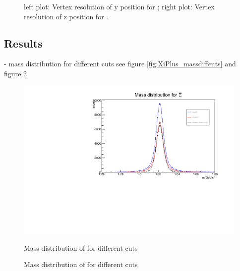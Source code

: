 		\begin{figure}
			\caption{left plot: Vertex resolution of y position for \anticascade; right plot: Vertex resolution of z position for \anticascade.}
			\label{fig:xi_vtxres_yz}
			
		\end{figure}
		
		
	\subsection{Results}
	
	- mass distribution for different cuts see figure \ref{fig:XiPlus_massdiffcuts} and figure \ref{fig:XiMinus_massdiffcuts}
		
		\begin{figure}
			\centering
				\includegraphics[width=1.1\textwidth]{./plots/Xi/XiPlus_m_diffcuts.pdf}
			\caption{Mass distribution of \anticascade for different cuts}
			\label{fig:XiPlus_massdiffcuts}
			
			\caption{Mass distribution of \cascade for different cuts}
			\label{fig:XiMinus_massdiffcuts}
		\end{figure}
		

